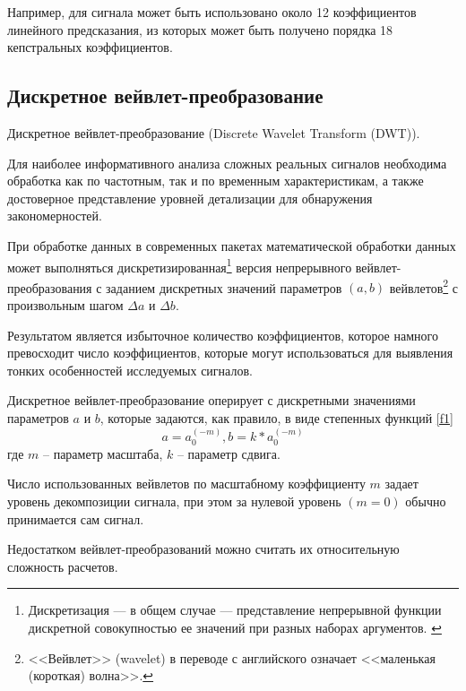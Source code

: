 Например, для сигнала может быть использовано около 12 коэффициентов линейного предсказания, из которых может быть получено порядка 18 кепстральных коэффициентов. \cite{methodisb2}



\subsection{Дискретное вейвлет-преобразование}
Дискретное вейвлет-преобразование (Discrete Wavelet Transform (DWT)).

Для наиболее информативного анализа сложных реальных сигналов необходима обработка как по частотным, так и по временным характеристикам, а также достоверное представление уровней детализации для обнаружения закономерностей. 

При обработке данных в современных пакетах математической обработки данных может выполняться дискретизированная\footnote{Дискретизация — в общем случае — представление непрерывной функции дискретной совокупностью ее значений при разных наборах аргументов. \cite{diskretiz}} версия непрерывного вейвлет-преобразования с заданием дискретных значений параметров $(a, b)$ вейвлетов\footnote{<<Вейвлет>> (wavelet) в переводе с английского означает <<маленькая (короткая) волна>>.} с произвольным шагом $\Delta a$ и $\Delta b$.

Результатом является избыточное количество коэффициентов, которое намного превосходит число коэффициентов, которые могут использоваться для выявления тонких особенностей исследуемых сигналов. 

Дискретное вейвлет-преобразование оперирует с дискретными значениями параметров $a$ и $b$, которые задаются, как правило, в виде степенных функций \eqref{f1}
\begin{equation}
	\label{f1}
	a = a_0 ^{(-m)}, b = k * a_0 ^{(-m)}
\end{equation}
где $m$ -- параметр масштаба, $k$ -- параметр сдвига.

Число использованных вейвлетов по масштабному коэффициенту $m$ задает уровень декомпозиции сигнала, при этом за нулевой уровень $(m = 0)$ обычно принимается сам сигнал.


Недостатком вейвлет-преобразований можно считать их относительную сложность расчетов. 

